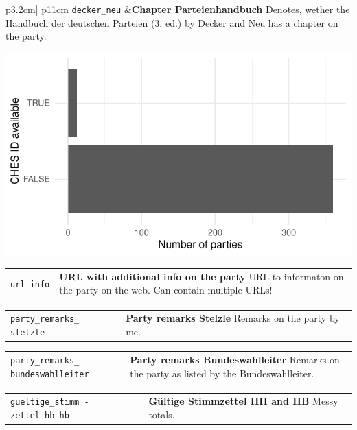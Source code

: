 \documentclass[
]{article}
\begin{document}
\begin{longtable}{p{3.2cm}| p{11cm}}
\texttt{decker\_neu} &\textbf{Chapter Parteienhandbuch}\newline 
Denotes, wether the Handbuch der deutschen Parteien (3. ed.) by Decker and Neu has a chapter on the party.

\hspace*{.25cm}
\begin{minipage}[t]{\linewidth }
\vspace{0pt}
\includegraphics[width = \linewidth]{cbelec/deckerneuplot.pdf}
\end{minipage}



\end{longtable}

\begin{longtable}{p{3.2cm}| p{11cm}}
\texttt{url\_info} &\textbf{URL with additional info on the party}\newline 
URL to informaton on the party on the web. Can contain multiple URLs!
\end{longtable}

\begin{longtable}{p{3.2cm}| p{11cm}}
\texttt{party\_remarks\_
stelzle} &\textbf{Party remarks Stelzle}\newline 
Remarks on the party by me.
\end{longtable}

\begin{longtable}{p{3.2cm}| p{11cm}}
\texttt{party\_remarks\_
bundeswahlleiter} &\textbf{Party remarks Bundeswahlleiter}\newline 
Remarks on the party as listed by the Bundeswahlleiter.
\end{longtable}

\begin{longtable}{p{3.2cm}| p{11cm}}
\texttt{gueltige\_stimm
-zettel\_hh\_hb} &\textbf{Gültige Stimmzettel HH and HB}\newline 
Messy totals.
\end{longtable}
\end{document}
